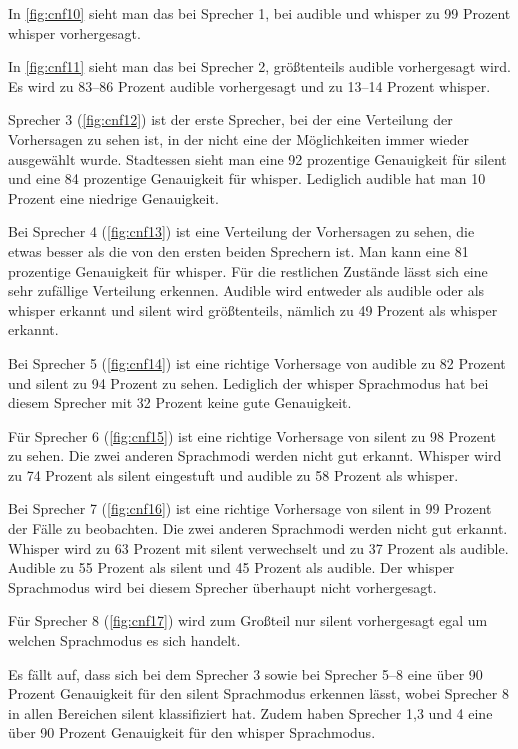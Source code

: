 In \ref{fig:cnf10} sieht man das bei Sprecher 1, bei audible und whisper zu 99 Prozent whisper vorhergesagt.

In \ref{fig:cnf11} sieht man das bei Sprecher 2, größtenteils audible vorhergesagt wird. Es wird zu 83–86 Prozent audible vorhergesagt und zu 13–14 Prozent whisper.

Sprecher 3 (\ref{fig:cnf12}) ist der erste Sprecher, bei der eine Verteilung der Vorhersagen zu sehen ist, in der nicht eine der Möglichkeiten immer wieder ausgewählt wurde. Stadtessen sieht man eine 92 prozentige Genauigkeit für silent und eine 84 prozentige Genauigkeit für whisper. Lediglich audible hat man 10 Prozent eine niedrige Genauigkeit.

Bei Sprecher 4 (\ref{fig:cnf13}) ist eine Verteilung der Vorhersagen zu sehen, die etwas besser als die von den ersten beiden Sprechern ist. Man kann eine 81 prozentige Genauigkeit für whisper. Für die restlichen Zustände lässt sich eine sehr zufällige Verteilung erkennen. Audible wird entweder als audible oder als whisper erkannt und silent wird größtenteils, nämlich zu 49 Prozent als whisper erkannt.

Bei Sprecher 5 (\ref{fig:cnf14}) ist eine richtige Vorhersage von audible zu 82 Prozent und silent zu 94 Prozent zu sehen. Lediglich der whisper Sprachmodus hat bei diesem Sprecher mit 32 Prozent keine gute Genauigkeit.

Für Sprecher 6 (\ref{fig:cnf15}) ist eine richtige Vorhersage von silent zu 98 Prozent zu sehen. Die zwei anderen Sprachmodi werden nicht gut erkannt. Whisper wird zu 74 Prozent als silent eingestuft und audible zu 58 Prozent als whisper.

Bei Sprecher 7 (\ref{fig:cnf16}) ist eine richtige Vorhersage von silent in 99 Prozent der Fälle zu beobachten. Die zwei anderen Sprachmodi werden nicht gut erkannt. Whisper wird zu 63 Prozent mit silent verwechselt und zu 37 Prozent als audible. Audible zu 55 Prozent als silent und 45 Prozent als audible. Der whisper Sprachmodus wird bei diesem Sprecher überhaupt nicht vorhergesagt.

Für Sprecher 8 (\ref{fig:cnf17}) wird zum Großteil nur silent vorhergesagt egal um welchen Sprachmodus es sich handelt.

Es fällt auf, dass sich bei dem Sprecher 3 sowie bei Sprecher 5–8 eine über 90 Prozent Genauigkeit für den silent Sprachmodus erkennen lässt, wobei Sprecher 8 in allen Bereichen silent klassifiziert hat. Zudem haben Sprecher 1,3 und 4 eine über 90 Prozent Genauigkeit für den whisper Sprachmodus.

